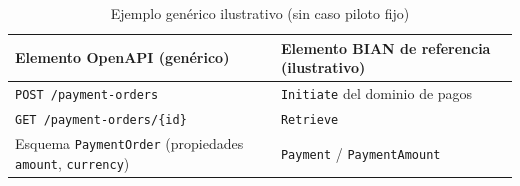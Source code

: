 \begin{table}[H]
  \centering
  \caption{Ejemplo genérico ilustrativo (sin caso piloto fijo)}
  \label{tab:ejemplo-generico}
  \begin{tabular}{@{}p{}p{}@{}}
    \toprule
    \textbf{Elemento OpenAPI (genérico)} & \textbf{Elemento BIAN de referencia (ilustrativo)} \\
    \midrule
    \texttt{POST /payment-orders} & \Behavior{} \texttt{Initiate} del dominio de pagos \\
    \texttt{GET /payment-orders/\{id\}} & \Behavior{} \texttt{Retrieve} \\
    Esquema \texttt{PaymentOrder} (propiedades \texttt{amount}, \texttt{currency}) &
    \BusinessObject{} \texttt{Payment} / \texttt{PaymentAmount} \\
    \bottomrule
  \end{tabular}
\end{table}
